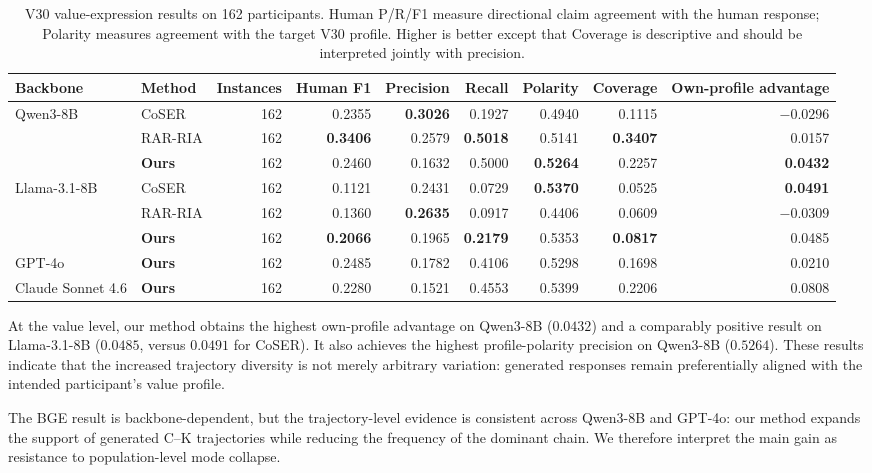 \begin{table}[t]
\centering
\scriptsize
\setlength{\tabcolsep}{4pt}
\caption{V30 value-expression results on 162 participants. Human P/R/F1
measure directional claim agreement with the human response; Polarity
measures agreement with the target V30 profile. Higher is better except that
Coverage is descriptive and should be interpreted jointly with precision.}
\label{tab:main_value_results_current}
\begin{tabular}{llrrrrrrr}
\toprule
\textbf{Backbone} & \textbf{Method} & \textbf{Instances} & \textbf{Human F1} &
\textbf{Precision} & \textbf{Recall} & \textbf{Polarity} &
\textbf{Coverage} & \textbf{Own-profile advantage} \\
\midrule
Qwen3-8B & CoSER & 162 & 0.2355 & \textbf{0.3026} & 0.1927 & 0.4940 & 0.1115 & $-0.0296$ \\
& RAR-RIA & 162 & \textbf{0.3406} & 0.2579 & \textbf{0.5018} & 0.5141 & \textbf{0.3407} & 0.0157 \\
& \textbf{Ours} & 162 & 0.2460 & 0.1632 & 0.5000 & \textbf{0.5264} & 0.2257 & \textbf{0.0432} \\
\midrule
Llama-3.1-8B & CoSER & 162 & 0.1121 & 0.2431 & 0.0729 & \textbf{0.5370} & 0.0525 & \textbf{0.0491} \\
& RAR-RIA & 162 & 0.1360 & \textbf{0.2635} & 0.0917 & 0.4406 & 0.0609 & $-0.0309$ \\
& \textbf{Ours} & 162 & \textbf{0.2066} & 0.1965 & \textbf{0.2179} & 0.5353 & \textbf{0.0817} & 0.0485 \\
\midrule
GPT-4o & \textbf{Ours} & 162 & 0.2485 & 0.1782 & 0.4106 & 0.5298 & 0.1698 & 0.0210 \\
Claude Sonnet 4.6 & \textbf{Ours} & 162 & 0.2280 & 0.1521 & 0.4553 & 0.5399 & 0.2206 & 0.0808 \\
\bottomrule
\end{tabular}
\end{table}

At the value level, our method obtains the highest own-profile advantage on
Qwen3-8B (\(\mathbf{0.0432}\)) and a comparably positive result on
Llama-3.1-8B (\(0.0485\), versus \(0.0491\) for CoSER). It also achieves the
highest profile-polarity precision on Qwen3-8B
(\(\mathbf{0.5264}\)). These results indicate that the increased trajectory
diversity is not merely arbitrary variation: generated responses remain
preferentially aligned with the intended participant's value profile.

The BGE result is backbone-dependent, but the trajectory-level evidence is
consistent across Qwen3-8B and GPT-4o: our method expands the support of
generated C--K trajectories while reducing the frequency of the dominant
chain. We therefore interpret the main gain as resistance to population-level
mode collapse.

